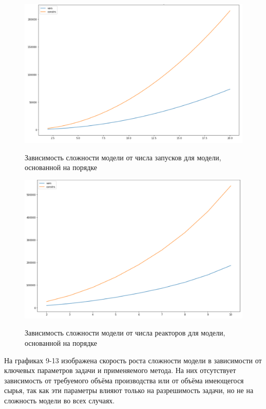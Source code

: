 \documentclass[12pt, twoside]{article}
\theoremstyle{definition}
\begin{document}
\begin{figure}[h]
\caption{Зависимость сложности модели от числа запусков для модели, основанной на порядке}
\centering
\includegraphics[width=1.0\textwidth]{экспериментальные данные/precendance/зависимость от числа запусков}
\label{fig:prec-time}
\end{figure}

\begin{figure}[h]
\caption{Зависимость сложности модели от числа реакторов для модели, основанной на порядке}
\centering
\includegraphics[width=1.0\textwidth]{экспериментальные данные/precendance/зависимость от числа реакторов}
\label{fig:prec-time}
\end{figure}

На графиках 9-13 изображена скорость роста сложности модели в зависимости от ключевых параметров задачи и применяемого метода. На них отсутствует зависимость от требуемого объёма производства или от объёма имеющегося сырья, так как эти параметры влияют только на разрешимость задачи, но не на сложность модели во всех случаях.
\end{document}
